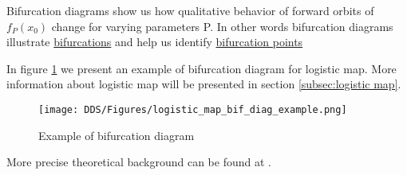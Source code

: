 \begin{remark}
    Bifurcation diagrams show us how qualitative behavior of forward orbits of $f_P(x_0)$ change for varying parameters P.
    In other words bifurcation diagrams illustrate \hyperref[def:bifurcation]{bifurcations} and help us identify \hyperref[def:bifurcation_point]{bifurcation points}
\end{remark}

\begin{example}
    In figure \ref{fig:bif_diag_example} we present an example of bifurcation diagram for logistic map. More information about logistic map will be presented in section \ref{subsec:logistic map}.
    \begin{figure}[!h]
        \centering
        \texttt{[image: DDS/Figures/logistic\_map\_bif\_diag\_example.png]}
        \caption{Example of bifurcation diagram}
        \label{fig:bif_diag_example}
    \end{figure}
\end{example}

More precise theoretical background can be found at \cite{Devaney20211026,Elaskar2017,Lynch2014}.

\endinput